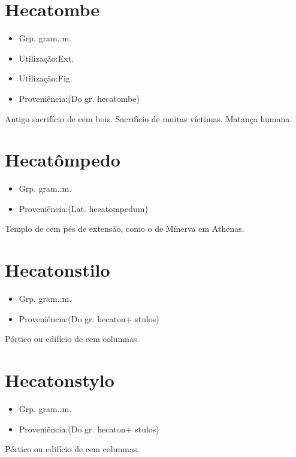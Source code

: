 \documentclass{article}
\begin{document}
\section{Hecatombe}
\begin{itemize}
\item {Grp. gram.:m.}
\end{itemize}
\begin{itemize}
\item {Utilização:Ext.}
\end{itemize}
\begin{itemize}
\item {Utilização:Fig.}
\end{itemize}
\begin{itemize}
\item {Proveniência:(Do gr. \textunderscore hecatombe\textunderscore )}
\end{itemize}
Antigo sacrifício de cem bois.
Sacrifício de muitas víctimas.
Matança humana.
\section{Hecatômpedo}
\begin{itemize}
\item {Grp. gram.:m.}
\end{itemize}
\begin{itemize}
\item {Proveniência:(Lat. \textunderscore hecatompedum\textunderscore )}
\end{itemize}
Templo de cem pés de extensão, como o de Mínerva em Athenas.
\section{Hecatonstilo}
\begin{itemize}
\item {Grp. gram.:m.}
\end{itemize}
\begin{itemize}
\item {Proveniência:(Do gr. \textunderscore hecaton\textunderscore  + \textunderscore stulos\textunderscore )}
\end{itemize}
Pórtico ou edifício de cem columnas.
\section{Hecatonstylo}
\begin{itemize}
\item {Grp. gram.:m.}
\end{itemize}
\begin{itemize}
\item {Proveniência:(Do gr. \textunderscore hecaton\textunderscore  + \textunderscore stulos\textunderscore )}
\end{itemize}
Pórtico ou edifício de cem columnas.
\end{document}
